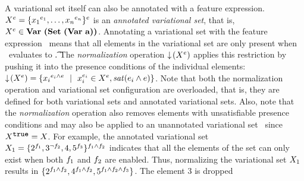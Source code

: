 A variational set itself can also be annotated with a feature expression.
%
$\annot \vset = \setDef {\annot [\dimMeta_1] {\elem_1},\ldots,\annot [\dimMeta_n] {\elem_n}}^\dimMeta$ is an
\emph{annotated variational set}, 
that is, $\annot \vset \in \annotvsetSet$.
Annotating a variational set with the feature expression \dimMeta\ means that all
elements in the variational set are only present when \dimMeta\ evaluates to \t.
The \emph{normalization} operation $\pushIn {\annot \vset}$ applies this
restriction by pushing it into the presence conditions of the individual
elements:
\ensuremath{
\pushIn {\annot \vset}
= 
\setDef{\annot [\dimMeta_i \wedge \dimMeta] {\elem_i} \myOR 
\annot [\dimMeta_i] \elem_i \in \annot \vset, \sat {\dimMeta_i \wedge \dimMeta}
}}.
Note that both the normalization operation and variational set configuration
are overloaded, that is, they are defined for both variational sets and 
annotated variational sets. 
Also, note that the \emph{normalization} operation also removes elements
with unsatisfiable presence conditions and may also be applied
to an unannotated variational set \vset\ since $\annot[\t]{\vset} = \vset$.
%
For example, the annotated variational set
$\vset_1 = \{\annot [\A] 2, \annot [\neg \B] 3, 4, \annot [\C] 5\}^{\A \wedge \B}$
indicates that all the elements of the set can only exist
when both $\A$ and $\B$ are enabled. Thus, normalizing the variational set $\vset_1$
results in
$\{\annot [\A \wedge \B] 2,\annot [\A \wedge \B] 4,\annot [\A \wedge \B \wedge \C] 5\}$. The element $3$ is dropped 
